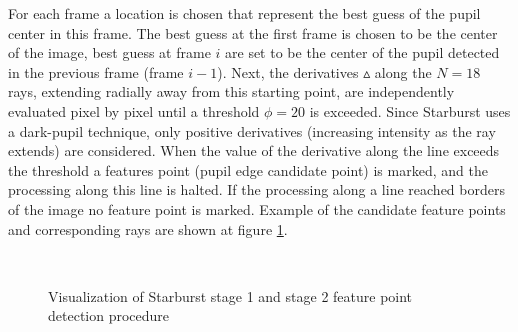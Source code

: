 \documentclass[12pt,fleqn]{book} %
\begin{document}
For each frame a location is chosen that represent the best guess of the pupil center in this frame. The best guess at the first frame is chosen to be the center of the image, best guess at frame $i$ are set to be the center of the pupil detected in the previous frame (frame $i-1$).  Next, the derivatives $\vartriangle$ along the $N = 18$ rays, extending radially away from this starting point, are independently evaluated pixel by pixel until a threshold $\phi = 20$ is exceeded. Since Starburst uses a dark-pupil technique, only positive derivatives (increasing intensity as the ray extends) are considered. When the value of the derivative along the line exceeds the threshold a features point (pupil edge candidate point) is marked, and the processing along this line is halted. If the processing along a line reached borders of the image no feature point is marked. Example of the candidate feature points and corresponding rays are shown at figure \ref{fig:starburst_example}. \bigskip


\begin{figure}[]
\begin{dBox}
\centering
  \mbox{
   }
   \caption{Visualization of Starburst stage 1 and stage 2 feature point detection procedure \label{fig:starburst_example} }   
\end{dBox}   
\end{figure}
\end{document}
